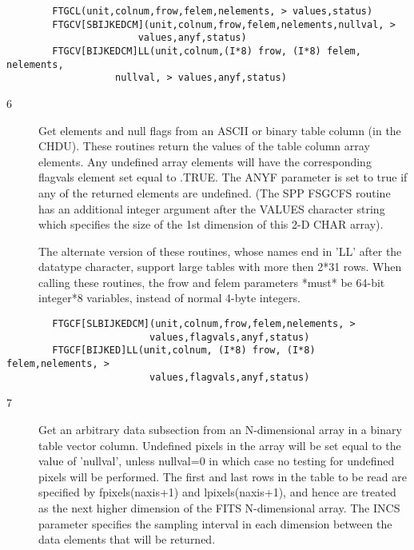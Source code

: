 \documentclass[11pt]{book}
\begin{document}
\begin{verbatim}
        FTGCL(unit,colnum,frow,felem,nelements, > values,status)
        FTGCV[SBIJKEDCM](unit,colnum,frow,felem,nelements,nullval, >
                       values,anyf,status)
        FTGCV[BIJKEDCM]LL(unit,colnum,(I*8) frow, (I*8) felem, nelements,
	               nullval, > values,anyf,status)
\end{verbatim}

\begin{description}
\item[6 ] Get elements and null flags from an ASCII or binary table column (in the
    CHDU).  These routines return the values of the table column array elements.
    Any undefined array elements will have the corresponding flagvals element
    set equal to .TRUE. The ANYF parameter is set to true if any of the
    returned elements are undefined.
    (The SPP FSGCFS routine has an additional integer argument after
    the VALUES character string which specifies the size of the 1st
    dimension of this 2-D CHAR array).

    The alternate version of these routines, whose names end in 'LL'
    after the datatype character, support large tables with more then
    2*31 rows.  When calling these routines, the frow and felem parameters
   *must* be 64-bit integer*8 variables, instead of normal 4-byte integers.
\end{description}

\begin{verbatim}
        FTGCF[SLBIJKEDCM](unit,colnum,frow,felem,nelements, >
                         values,flagvals,anyf,status)
        FTGCF[BIJKED]LL(unit,colnum, (I*8) frow, (I*8) felem,nelements, >
                         values,flagvals,anyf,status)
\end{verbatim}

\begin{description}
\item[7 ] Get an arbitrary data subsection from an N-dimensional array
    in a binary table vector column.  Undefined pixels
    in the array will be set equal to the value of 'nullval',
    unless nullval=0 in which case no testing for undefined pixels will
    be performed.  The first and last rows in the table to be read
    are specified by fpixels(naxis+1) and lpixels(naxis+1), and hence
    are treated as the next higher dimension of the FITS N-dimensional
    array.  The INCS parameter specifies the sampling interval in
   each dimension between the data elements that will be returned.
\end{description}
\end{document}
